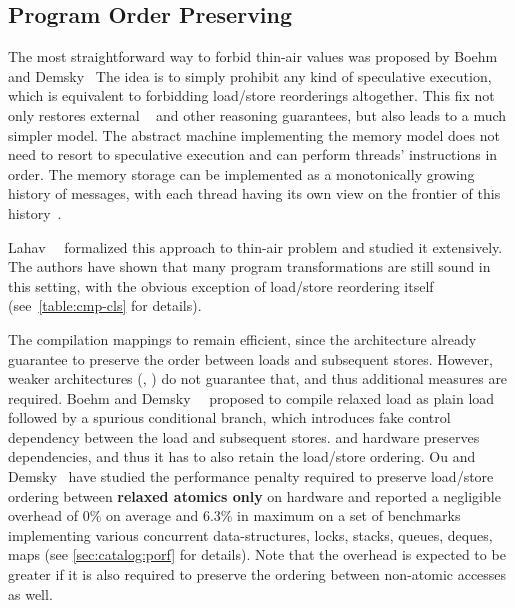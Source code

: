 \subsection{Program Order Preserving}
\label{sec:analysis:porf}

The most straightforward way to forbid thin-air values 
was proposed by Boehm and Demsky~\cite{Boehm-Demsky:MSPC14}
The idea is to simply prohibit any kind of speculative execution, 
which is equivalent to forbidding load/store reorderings altogether. 
This fix not only restores external \DRF~\cite{Lahav-al:PLDI17}
and other reasoning guarantees, but also leads to 
a much simpler model. The abstract machine implementing 
the memory model does not need to resort to speculative execution 
and can perform threads' instructions in order. 
The memory storage can be implemented as a 
monotonically growing history of messages, 
with each thread having its own view on 
the frontier of this history~\cite{Dolan-al:PLDI18, Doherty-al:PPoPP19}.

Lahav~\etal~\cite{Lahav-al:PLDI17} formalized this approach
to thin-air problem and studied it extensively. 
The authors have shown that many 
program transformations are still sound in this setting, 
with the obvious exception of load/store reordering itself
(see~\cref{table:cmp-cls} for details).

The compilation mappings to \Intel remain efficient, 
since the architecture already guarantee to preserve the order 
between loads and subsequent stores. 
However, weaker architectures (\ARM, \POWER) do not guarantee that, 
and thus additional measures are required.
Boehm and Demsky~\etal~\cite{Boehm-Demsky:MSPC14} proposed to compile relaxed load 
as plain load followed by a spurious conditional branch,
which introduces fake control dependency between 
the load and subsequent stores. 
\ARM and \POWER hardware preserves dependencies, 
and thus it has to also retain the load/store ordering. 
Ou and Demsky~\cite{Ou-Demsky:OOPSLA18} have studied 
the performance penalty required to preserve
load/store ordering between \textbf{relaxed atomics only}
on  hardware and reported a negligible overhead
of 0\% on average and 6.3\% in maximum on a set of benchmarks
implementing various concurrent data-structures, 
\eg locks, stacks, queues, deques, maps \etc 
(see \ref{sec:catalog:porf} for details).
Note that the overhead is expected to be greater 
if it is also required to preserve the ordering 
between non-atomic accesses as well. 

